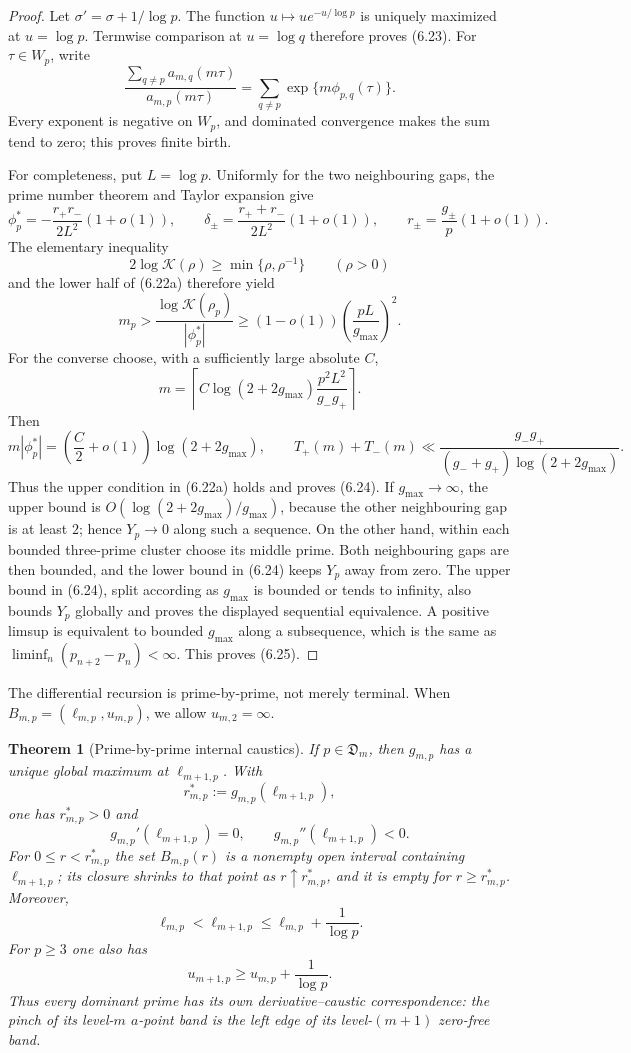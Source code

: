 \documentclass[11pt]{article}
\newtheorem{theorem}{Theorem}[section]
\theoremstyle{definition}
\theoremstyle{remark}
\begin{document}
\begin{proof}
Let $\sigma'=\sigma+1/\log p$.  The function
$u\mapsto ue^{-u/\log p}$ is uniquely maximized at $u=\log p$.
Termwise comparison at $u=\log q$ therefore proves (6.23).
For $\tau\in W_p$, write
\[
 \frac{\sum_{q\ne p}a_{m,q}(m\tau)}{a_{m,p}(m\tau)}
 =\sum_{q\ne p}\exp\{m\phi_{p,q}(\tau)\}.
\tag{6.26}
\]
Every exponent is negative on $W_p$, and dominated convergence makes
the sum tend to zero; this proves finite birth.

For completeness, put $L=\log p$.  Uniformly for the two neighbouring
gaps, the prime number theorem and Taylor expansion give
\[
 \phi_p^*=-\frac{r_+r_-}{2L^2}(1+o(1)),\qquad
 \delta_\pm=\frac{r_++r_-}{2L^2}(1+o(1)),\qquad
 r_\pm=\frac{g_\pm}{p}(1+o(1)).
\]
The elementary inequality
\[
 2\log\mathcal K(\rho)\ge\min\{\rho,\rho^{-1}\}
 \qquad(\rho>0)
\]
and the lower half of (6.22a) therefore yield
\[
 m_p>\frac{\log\mathcal K(\rho_p)}{|\phi_p^*|}
 \ge(1-o(1))\left(\frac{pL}{g_{\max}}\right)^2.
\]
For the converse choose, with a sufficiently large absolute $C$,
\[
 m=\left\lceil
 C\log(2+2g_{\max})\frac{p^2L^2}{g_-g_+}
 \right\rceil.
\]
Then
\[
 m|\phi_p^*|=\left(\frac C2+o(1)\right)\log(2+2g_{\max}),
 \qquad
 T_+(m)+T_-(m)\ll
 \frac{g_-g_+}{(g_-+g_+)\log(2+2g_{\max})}.
\]
Thus the upper condition in (6.22a) holds and proves (6.24).  If
$g_{\max}\to\infty$, the upper bound is
$O(\log(2+2g_{\max})/g_{\max})$, because the other neighbouring gap is at
least $2$; hence $Y_p\to0$ along such a sequence.  On the other hand,
within each bounded three-prime cluster choose its middle prime.  Both neighbouring
gaps are then bounded, and the lower bound in (6.24) keeps $Y_p$ away from zero.
The upper bound in (6.24), split according as $g_{\max}$ is bounded or tends to
infinity, also bounds $Y_p$ globally and proves the displayed sequential
equivalence.  A positive limsup is equivalent to bounded $g_{\max}$ along a
subsequence, which is the same as $\liminf_n(p_{n+2}-p_n)<\infty$.  This proves
(6.25).
\end{proof}

The differential recursion is prime-by-prime, not merely terminal.
When $B_{m,p}=(\ell_{m,p},u_{m,p})$, we allow $u_{m,2}=\infty$.

\begin{theorem}[Prime-by-prime internal caustics]
\label{thm:internal-caustics}
If $p\in\mathfrak D_m$, then $g_{m,p}$ has a unique global maximum at
$\ell_{m+1,p}$.  With
\[
 r^*_{m,p}:=g_{m,p}(\ell_{m+1,p}),
\tag{6.27}
\]
one has $r^*_{m,p}>0$ and
\[
 g_{m,p}'(\ell_{m+1,p})=0,
 \qquad
 g_{m,p}''(\ell_{m+1,p})<0.
\tag{6.28}
\]
For $0\le r<r^*_{m,p}$ the set $B_{m,p}(r)$ is a nonempty open
interval containing $\ell_{m+1,p}$; its closure shrinks to that point as
$r\uparrow r^*_{m,p}$, and it is empty for $r\ge r^*_{m,p}$.  Moreover,
\[
 \ell_{m,p}<\ell_{m+1,p}\le
 \ell_{m,p}+\frac1{\log p}.
\tag{6.29}
\]
For $p\ge3$ one also has
\[
 u_{m+1,p}\ge u_{m,p}+\frac1{\log p}.
\]
Thus every dominant prime has its own derivative--caustic
correspondence: the pinch of its level-$m$ $a$-point band is the left
edge of its level-$(m+1)$ zero-free band.
\end{theorem}
\end{document}
